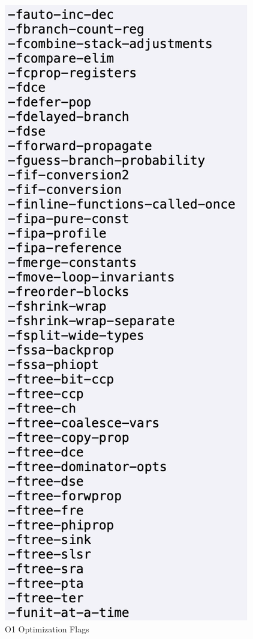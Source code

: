 \documentclass[conference]{IEEEtran}
\begin{document}
\begin{figure}[htbp]
\centering
\includegraphics [width=0.4\linewidth]{pictures/o1.png}
\caption{O1 Optimization Flags\cite{b2}}
\label{fig2}
\end{figure}
\end{document}
